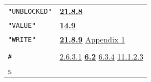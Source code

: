 \documentclass[a4paper]{scrbook}
\begin{document}
\begin{longtable}[]{@{}ll@{}}
\begin{minipage}[t]{0.24\columnwidth}
\texttt{"UNBLOCKED"}\strut
\end{minipage} & \begin{minipage}[t]{0.70\columnwidth}\raggedright\strut
\textbf{\href{21-interrupts.md\#2188-unblocked}{21.8.8}}\strut
\end{minipage}\tabularnewline
\begin{minipage}[t]{0.24\columnwidth}\raggedright\strut
\texttt{"VALUE"}\strut
\end{minipage} & \begin{minipage}[t]{0.70\columnwidth}\raggedright\strut
\textbf{\href{14-data-type-declarations.md\#149-the-rsubr-decl}{14.9}}\strut
\end{minipage}\tabularnewline
\begin{minipage}[t]{0.24\columnwidth}\raggedright\strut
\texttt{"WRITE"}\strut
\end{minipage} & \begin{minipage}[t]{0.70\columnwidth}\raggedright\strut
\textbf{\href{21-interrupts.md\#2189-read-and-write}{21.8.9}}
\href{appendix-1-a-look-inside.md\#appendix-1-a-look-inside}{Appendix 1}\strut
\end{minipage}\tabularnewline
\begin{minipage}[t]{0.24\columnwidth}\raggedright\strut
\strut
\end{minipage} & \begin{minipage}[t]{0.70\columnwidth}\raggedright\strut
\strut
\end{minipage}\tabularnewline
\begin{minipage}[t]{0.24\columnwidth}\raggedright\strut
\texttt{\#}\strut
\end{minipage} & \begin{minipage}[t]{0.70\columnwidth}\raggedright\strut
\href{02-read-evaluate-print.md\#2631-non-pnames}{2.6.3.1}
\textbf{\href{06-data-types.md\#62-printed-representation-1}{6.2}} \href{06-data-types.md\#634-chtype-1}{6.3.4}
\href{11-input-output.md\#11123-princ}{11.1.2.3}\strut
\end{minipage}\tabularnewline
\begin{minipage}[t]{0.24\columnwidth}\raggedright\strut
\strut
\end{minipage} & \begin{minipage}[t]{0.70\columnwidth}\raggedright\strut
\strut
\end{minipage}\tabularnewline
\begin{minipage}[t]{0.24\columnwidth}\raggedright\strut
\texttt{\$}\strut
\end{minipage} & \begin{minipage}[t]{0.70\columnwidth}\raggedright\strut

\end{minipage}
\end{longtable}
\end{document}
